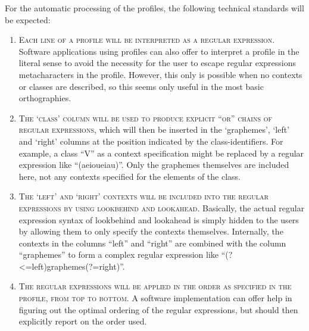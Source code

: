 For the automatic processing of the profiles, the following technical standards will be expected:
\begin{enumerate}
	\def\labelenumi{\arabic{enumi}.} 
	\item \textsc{Each line of a profile will be interpreted as a regular expression. }Software applications using profiles can also offer to interpret a profile in the literal sense to avoid the necessity for the user to escape regular expressions metacharacters in the profile. However, this only is possible when no contexts or classes are described, so this seems only useful in the most basic orthographies. 
	\item \textsc{The `class' column will be used to produce explicit ``or'' chains of regular expressions}, which will then be inserted in the `graphemes', `left' and `right' columns at the position indicated by the class-identifiers. For example, a class ``V'' as a context specification might be replaced by a regular expression like ``(a\textbar{}e\textbar{}i\textbar{}o\textbar{}u\textbar{}ei\textbar{}au)''. Only the graphemes themselves are included here, not any contexts specified for the elements of the class. 
	\item \textsc{The `left' and `right' contexts will be included into the regular expressions by using lookbehind and lookahead}. Basically, the actual regular expression syntax of lookbehind and lookahead is simply hidden to the users by allowing them to only specify the contexts themselves. Internally, the contexts in the columns ``left'' and ``right'' are combined with the column ``graphemes'' to form a complex regular expression like ``(?\textless{}=left)graphemes(?=right)''. 
	\item \textsc{The regular expressions will be applied in the order as specified in the profile, from top to bottom.} A software implementation can offer help in figuring out the optimal ordering of the regular expressions, but should then explicitly report on the order used. 
\end{enumerate}

